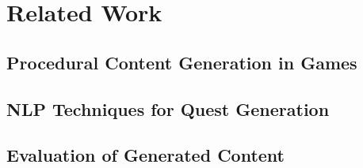 \clearpage

\chapter{Related Work}

\section{Procedural Content Generation in Games}
\section{NLP Techniques for Quest Generation}
\section{Evaluation of Generated Content}

\newpage
